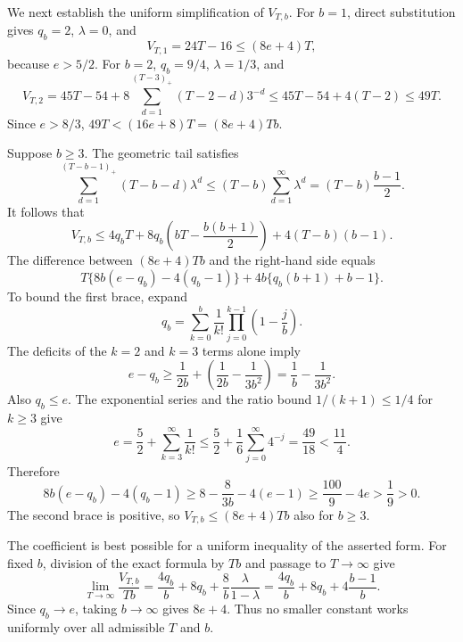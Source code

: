 We next establish the uniform simplification of \(V_{T,b}\). For \(b=1\), direct substitution gives \(q_b=2\), \(\lambda=0\), and
\[
V_{T,1}=24T-16\le(8e+4)T,
\]
because \(e>5/2\). For \(b=2\), \(q_b=9/4\), \(\lambda=1/3\), and
\[
V_{T,2}=45T-54+8\sum_{d=1}^{(T-3)_+}(T-2-d)3^{-d}
\le45T-54+4(T-2)\le49T.
\]
Since \(e>8/3\), \(49T<(16e+8)T=(8e+4)Tb\).

Suppose \(b\ge3\). The geometric tail satisfies
\[
\sum_{d=1}^{(T-b-1)_+}(T-b-d)\lambda^d
\le(T-b)\sum_{d=1}^{\infty}\lambda^d
=(T-b)\frac{b-1}{2}.
\]
It follows that
\[
V_{T,b}\le4q_bT+8q_b\left(bT-\frac{b(b+1)}2\right)+4(T-b)(b-1).
\]
The difference between \((8e+4)Tb\) and the right-hand side equals
\[
T\{8b(e-q_b)-4(q_b-1)\}+4b\{q_b(b+1)+b-1\}.
\]
To bound the first brace, expand
\[
q_b=\sum_{k=0}^b\frac1{k!}\prod_{j=0}^{k-1}\left(1-\frac jb\right).
\]
The deficits of the \(k=2\) and \(k=3\) terms alone imply
\[
e-q_b\ge\frac1{2b}+\left(\frac1{2b}-\frac1{3b^2}\right)=\frac1b-\frac1{3b^2}.
\]
Also \(q_b\le e\). The exponential series and the ratio bound \(1/(k+1)\le1/4\) for \(k\ge3\) give
\[
e=\frac52+\sum_{k=3}^{\infty}\frac1{k!}
\le\frac52+\frac16\sum_{j=0}^{\infty}4^{-j}
=\frac{49}{18}<\frac{11}{4}.
\]
Therefore
\[
8b(e-q_b)-4(q_b-1)
\ge8-\frac8{3b}-4(e-1)
\ge\frac{100}{9}-4e>\frac19>0.
\]
The second brace is positive, so \(V_{T,b}\le(8e+4)Tb\) also for \(b\ge3\).

The coefficient is best possible for a uniform inequality of the asserted form. For fixed \(b\), division of the exact formula by \(Tb\) and passage to \(T\to\infty\) give
\[
\lim_{T\to\infty}\frac{V_{T,b}}{Tb}
=\frac{4q_b}{b}+8q_b+\frac8b\frac{\lambda}{1-\lambda}
=\frac{4q_b}{b}+8q_b+4\frac{b-1}{b}.
\]
Since \(q_b\to e\), taking \(b\to\infty\) gives \(8e+4\). Thus no smaller constant works uniformly over all admissible \(T\) and \(b\).

